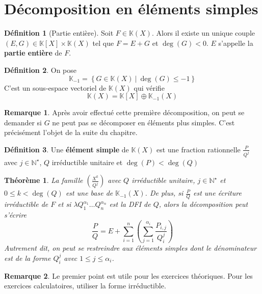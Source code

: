 \documentclass[french]{book}
\newcommand{\N}{\mathbb{N}}
\newcommand{\K}{\mathbb{K}}
\newcommand{\st}{^\star}
\theoremstyle{plain}
\newtheorem{thm}{Théorème}[chapter]
\theoremstyle{definition}
\newtheorem{dfn}{Définition}[chapter]
\newtheorem{rmq}{Remarque}[chapter]
\theoremstyle{remark}
\begin{document}
\section{Décomposition en éléments simples}
\begin{dfn}[Partie entière]
	Soit $F\in\K(X)$. Alors il existe un unique couple $(E,G)\in\K[X]\times\K(X)$ tel que $F=E+G$ et $\deg(G)<0$. $E$ s'appelle la \textbf{partie entière} de $F$.
\end{dfn}
\begin{dfn}
	On pose $$\K_{-1}=\left\{G\in\K(X)\ | \ \deg(G)\leqslant-1\right\}$$ C'est un sous-espace vectoriel de $\K(X)$ qui vérifie $$\K(X)=\K[X]\oplus\K_{-1}(X)$$
\end{dfn}
\begin{rmq} Après avoir effectué cette première décomposition, on peut se demander si $G$  ne peut pas se décomposer en éléments plus simples. C'est précisément l'objet de la suite du chapitre. \end{rmq}
\begin{dfn}
	Une \textbf{élément simple} de $\K(X)$ est une fraction rationnelle $\displaystyle\frac{P}{Q^j}$ avec $j\in\N\st$, $Q$ irréductible unitaire et $\deg(P)<\deg(Q)$
\end{dfn}
\begin{thm}
	La famille $\displaystyle\left(\frac{X^k}{Q^j}\right)$ avec $Q$ irréductible unitaire, $j\in\N\st$ et $0\leqslant k<\deg(Q)$ est une base de $\K_{-1}(X)$. De plus, si $\displaystyle \frac{P}{Q}$ est une écriture irréductible de $F$ et si $\lambda Q_1^{\alpha_1}\ldots Q_n^{\alpha_n}$ est la DFI de $Q$, alors la décomposition peut s'écrire $$\frac{P}{Q}=E+\sum_{i=1}^{n}\left(\sum_{j=1}^{\alpha_i}\frac{P_{i,j}}{Q_i^j}\right)$$ Autrement dit, on peut se restreindre aux éléments simples dont le dénominateur est de la forme $Q_i^j$ avec $1\leqslant j\leqslant \alpha_i$.
\end{thm}
\begin{rmq} Le premier point est utile pour les exercices théoriques. Pour les exercices calculatoires, utiliser la forme irréductible. \end{rmq}
\end{document}
